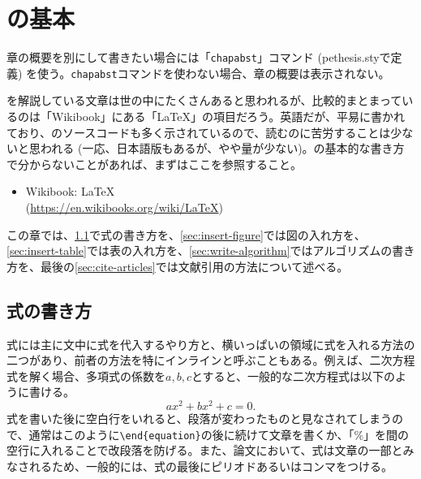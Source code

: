 \chapter{\latex の基本}
\label{chap:latex-basic}

\begin{chapabst}
  章の概要を別にして書きたい場合には「\texttt{chapabst}」コマンド (pethesis.styで定義) を使う。\texttt{chapabst}コマンドを使わない場合、章の概要は表示されない。
\end{chapabst}

\latex を解説している文章は世の中にたくさんあると思われるが、比較的まとまっているのは「Wikibook」にある「LaTeX」の項目だろう。英語だが、平易に書かれており、\latex のソースコードも多く示されているので、読むのに苦労することは少ないと思われる (一応、日本語版もあるが、やや量が少ない)。\latex の基本的な書き方で分からないことがあれば、まずはここを参照すること。
\begin{itemize}
  \item Wikibook: LaTeX \\(\url{https://en.wikibooks.org/wiki/LaTeX})
\end{itemize}

この章では、\cref{sec:write-equation}で式の書き方を、\cref{sec:insert-figure}では図の入れ方を、\cref{sec:insert-table}では表の入れ方を、\cref{sec:write-algorithm}ではアルゴリズムの書き方を、最後の\cref{sec:cite-articles}では文献引用の方法について述べる。

\section{式の書き方}
\label{sec:write-equation}

式には主に文中に式を代入するやり方と、横いっぱいの領域に式を入れる方法の二つがあり、前者の方法を特にインラインと呼ぶこともある。例えば、二次方程式を解く場合、多項式の係数を$a, b, c$とすると、一般的な二次方程式は以下のように書ける。
%
\begin{equation}
  a x^2 + b x^2 + c = 0.
  \label{eq:quadratic-equation}
\end{equation}
%
式を書いた後に空白行をいれると、段落が変わったものと見なされてしまうので、通常はこのように\texttt{\textbackslash end\{equation\}}の後に続けて文章を書くか、「\%」を間の空行に入れることで改段落を防げる。また、論文において、式は文章の一部とみなされるため、一般的には、式の最後にピリオドあるいはコンマをつける。

